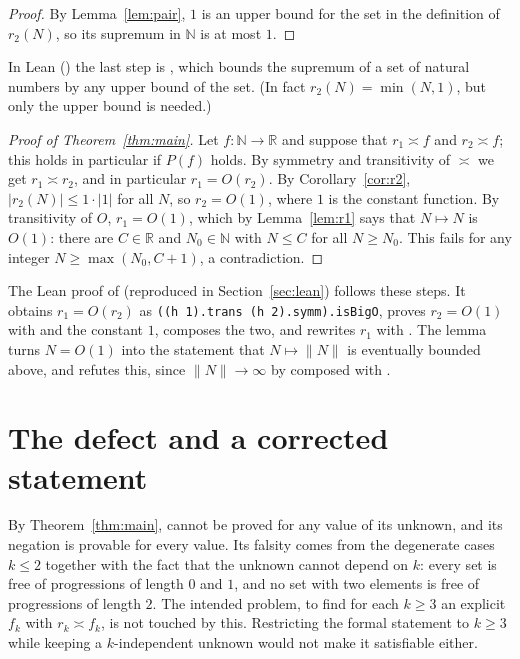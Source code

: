 \documentclass[11pt]{amsart}
\theoremstyle{plain}
\theoremstyle{definition}
\newcommand{\N}{\mathbb{N}}
\newcommand{\R}{\mathbb{R}}
\begin{document}
\begin{proof}
By Lemma~\ref{lem:pair}, $1$ is an upper bound for the set in the definition of $r_2(N)$, so its supremum in $\N$ is at most $1$.
\end{proof}

In Lean () the last step is , which bounds the supremum of a set of natural numbers by any upper bound of the set. (In fact $r_2(N)=\min(N,1)$, but only the upper bound is needed.)

\begin{proof}[Proof of Theorem~\ref{thm:main}]
Let $f\colon\N\to\R$ and suppose that $r_1\asymp f$ and $r_2\asymp f$; this holds in particular if $P(f)$ holds.
By symmetry and transitivity of $\asymp$ we get $r_1\asymp r_2$, and in particular $r_1=O(r_2)$.
By Corollary~\ref{cor:r2}, $|r_2(N)|\le 1\cdot|1|$ for all $N$, so $r_2=O(1)$, where $1$ is the constant function.
By transitivity of $O$, $r_1=O(1)$, which by Lemma~\ref{lem:r1} says that $N\mapsto N$ is $O(1)$: there are $C\in\R$ and $N_0\in\N$ with $N\le C$ for all $N\ge N_0$.
This fails for any integer $N\ge\max(N_0,C+1)$, a contradiction.
\end{proof}

The Lean proof of  (reproduced in Section~\ref{sec:lean}) follows these steps.
It obtains $r_1=O(r_2)$ as \texttt{((h 1).trans (h 2).symm).isBigO}, proves $r_2=O(1)$ with  and the constant $1$, composes the two, and rewrites $r_1$ with .
The lemma  turns $N=O(1)$ into the statement that $N\mapsto\lVert N\rVert$ is eventually bounded above, and  refutes this, since $\lVert N\rVert\to\infty$ by  composed with .

\section{The defect and a corrected statement}\label{sec:defect}

By Theorem~\ref{thm:main},  cannot be proved for any value of its unknown, and its negation is provable for every value.
Its falsity comes from the degenerate cases $k\le2$ together with the fact that the unknown cannot depend on $k$: every set is free of progressions of length $0$ and $1$, and no set with two elements is free of progressions of length $2$.
The intended problem, to find for each $k\ge3$ an explicit $f_k$ with $r_k\asymp f_k$, is not touched by this.
Restricting the formal statement to $k\ge3$ while keeping a $k$-independent unknown would not make it satisfiable either.
\end{document}
